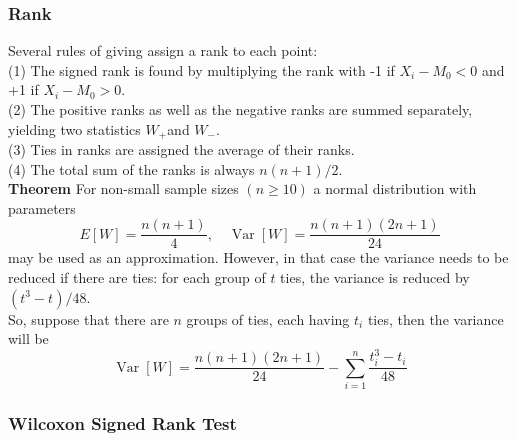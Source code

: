 \documentclass[a4paper,12pt]{article}
\begin{document}
\subsubsection{Rank}
Several rules of giving assign a rank to each point:\\
(1) The signed rank is found by multiplying the rank with -1 if $X_i-M_0<0$ and +1 if $X_i-M_0>0$.\\
(2) The positive ranks as well as the negative ranks are summed separately, yielding two statistics $W_{+}$and $W_{-}$.\\
(3) Ties in ranks are assigned the average of their ranks.\\
(4) The total sum of the ranks is always $n(n + 1)/2$.\\
\textbf{Theorem} For non-small sample sizes $(n \geq 10)$ a normal distribution with parameters
\begin{equation}
E[W]=\frac{n(n+1)}{4}, \quad \operatorname{Var}[W]=\frac{n(n+1)(2 n+1)}{24}
\end{equation}
may be used as an approximation. However, in that case the variance needs to be reduced if there are ties: for each group of $t$ ties, the variance is reduced by $\left(t^3-t\right) / 48$.\\
So, suppose that there are $n$ groups of ties, each having $t_i$ ties, then the variance will be 
\begin{equation}
     \operatorname{Var}[W]=\frac{n(n+1)(2 n+1)}{24}-\sum_{i=1}^n\dfrac{t_i^3-t_i}{48}
    \end{equation}

\subsubsection{Wilcoxon Signed Rank Test}
\end{document}

